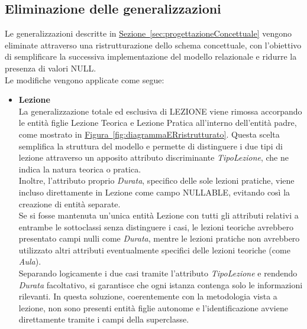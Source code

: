 \documentclass[10pt,twoside]{article}
\begin{document}
{    \subsection{Eliminazione delle generalizzazioni}{
        Le generalizzazioni descritte in \hyperref[sec:progettazioneConcettuale]{Sezione~\ref*{sec:progettazioneConcettuale}} vengono 
        eliminate attraverso una ristrutturazione dello schema concettuale, 
        con l’obiettivo di semplificare la successiva implementazione del modello relazionale 
        e ridurre la presenza di valori NULL. \\
        Le modifiche vengono applicate come segue:
        \begin{itemize}
            \item \textbf{Lezione} \\ La generalizzazione totale ed esclusiva di LEZIONE viene rimossa 
            accorpando le entità figlie Lezione Teorica e Lezione Pratica all'interno dell'entità 
            padre, come mostrato in \hyperref[fig:diagrammaERristrutturato]{Figura~\ref*{fig:diagrammaERristrutturato}}.
            Questa scelta semplifica la struttura del modello 
            e permette di distinguere i due tipi di lezione attraverso un apposito attributo 
            discriminante \textit{TipoLezione}, che ne indica la natura teorica o pratica. \\
            Inoltre, l’attributo proprio \textit{Durata}, specifico delle sole lezioni pratiche, 
            viene incluso direttamente in 
            Lezione come campo NULLABLE, evitando così la creazione di entità separate. \\
            Se si fosse mantenuta un’unica entità Lezione con tutti gli attributi relativi a 
            entrambe le sottoclassi senza distinguere i casi, le lezioni teoriche avrebbero 
            presentato campi nulli come \textit{Durata}, mentre le lezioni pratiche non avrebbero 
            utilizzato altri attributi eventualmente specifici delle lezioni teoriche (come \textit{Aula}). \\
            Separando logicamente i due casi tramite l’attributo \textit{TipoLezione} e rendendo \textit{Durata} 
            facoltativo, si garantisce che ogni istanza contenga solo le informazioni rilevanti.
            In questa soluzione, coerentemente con la metodologia vista a lezione, 
            non sono presenti entità figlie autonome e l’identificazione avviene direttamente 
            tramite i campi della superclasse. \\

\end{itemize}}}
\end{document}
